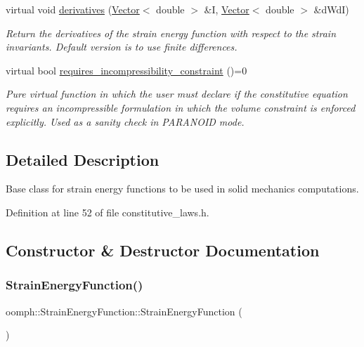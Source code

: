 \begin{DoxyCompactItemize}
virtual void \hyperlink{classoomph_1_1StrainEnergyFunction_a81ca7bb14cce217ffac9d308dba39756}{derivatives} (\hyperlink{classoomph_1_1Vector}{Vector}$<$ double $>$ \&I, \hyperlink{classoomph_1_1Vector}{Vector}$<$ double $>$ \&d\+WdI)
\begin{DoxyCompactList}\small\item\em Return the derivatives of the strain energy function with respect to the strain invariants. Default version is to use finite differences. \end{DoxyCompactList}\item 
virtual bool \hyperlink{classoomph_1_1StrainEnergyFunction_a312fe03c070f5c45a99ae4e186936147}{requires\+\_\+incompressibility\+\_\+constraint} ()=0
\begin{DoxyCompactList}\small\item\em Pure virtual function in which the user must declare if the constitutive equation requires an incompressible formulation in which the volume constraint is enforced explicitly. Used as a sanity check in P\+A\+R\+A\+N\+O\+ID mode. \end{DoxyCompactList}\end{DoxyCompactItemize}


\subsection{Detailed Description}
Base class for strain energy functions to be used in solid mechanics computations. 

Definition at line 52 of file constitutive\+\_\+laws.\+h.



\subsection{Constructor \& Destructor Documentation}
\mbox{\label{classoomph_1_1StrainEnergyFunction_a027b9babcedcefb3fd06a6deace8f6b6}} 
\subsubsection{\texorpdfstring{Strain\+Energy\+Function()}{StrainEnergyFunction()}}
{\footnotesize\ttfamily oomph\+::\+Strain\+Energy\+Function\+::\+Strain\+Energy\+Function (\begin{DoxyParamCaption}{ }\end{DoxyParamCaption})\hspace{0.3cm}{\ttfamily [inline]}}




